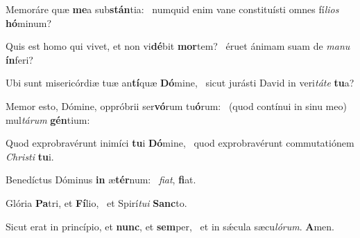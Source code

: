\item Memoráre quæ \textbf{me}a sub\textbf{stán}\-tia:~\psstar{} numquid enim vane constituísti omnes fí\textit{lios} \textbf{hó}minum?
\item Quis est homo qui vivet, et non vi\textbf{dé}bit \textbf{mor}tem?~\psstar{} éruet ánimam suam de \textit{manu} \textbf{ín}feri?
\item Ubi sunt misericórdiæ tuæ an\textbf{tí}quæ \textbf{Dó}mine,~\psstar{} sicut jurásti David in veri\textit{táte} \textbf{tu}a?
\item Memor esto, Dómine, oppróbrii ser\textbf{vó}rum tu\textbf{ó}rum:~\psstar{} (quod contínui in sinu meo) mul\textit{tárum} \textbf{gén}tium:
\item Quod exprobravérunt inimíci \textbf{tu}i \textbf{Dó}mine,~\psstar{} quod exprobravérunt commutatiónem \textit{Christi} \textbf{tu}i.
\item Benedíctus Dóminus \textbf{in} æ\textbf{tér}num:~\psstar{} \textit{fiat}, \textbf{fi}at.
\item Glória \textbf{Pa}tri, et \textbf{Fí}lio,~\psstar{} et Spirí\textit{tui} \textbf{Sanc}to.
\item Sicut erat in princípio, et \textbf{nunc}, et \textbf{sem}per,~\psstar{} et in sǽcula sæcu\textit{lórum}. \textbf{A}men.
